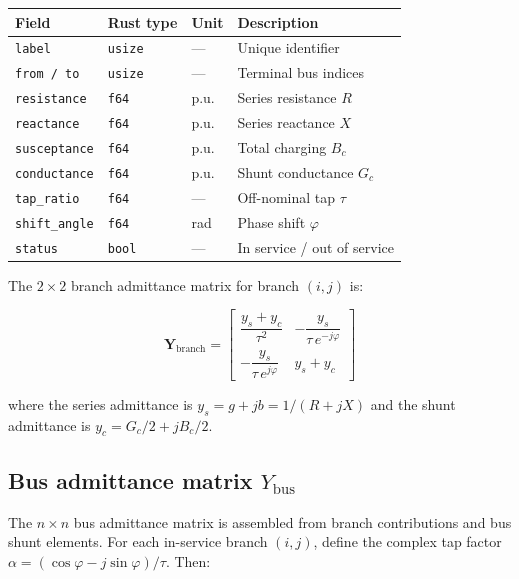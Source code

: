 \documentclass[11pt,a4paper]{article}
\begin{document}
\begin{center}
\small
\begin{tabular}{llll}
  \toprule
  \textbf{Field} & \textbf{Rust type} & \textbf{Unit} & \textbf{Description} \\
  \midrule
  \texttt{label}        & \texttt{usize} & --- & Unique identifier \\
  \texttt{from / to}    & \texttt{usize} & --- & Terminal bus indices \\
  \texttt{resistance}   & \texttt{f64}   & p.u. & Series resistance $R$ \\
  \texttt{reactance}    & \texttt{f64}   & p.u. & Series reactance $X$ \\
  \texttt{susceptance}  & \texttt{f64}   & p.u. & Total charging $B_c$ \\
  \texttt{conductance}  & \texttt{f64}   & p.u. & Shunt conductance $G_c$ \\
  \texttt{tap\_ratio}   & \texttt{f64}   & --- & Off-nominal tap $\tau$ \\
  \texttt{shift\_angle} & \texttt{f64}   & rad  & Phase shift $\varphi$ \\
  \texttt{status}       & \texttt{bool}  & --- & In service / out of service \\
  \bottomrule
\end{tabular}
\end{center}

\noindent
The $2\times2$ branch admittance matrix for branch $(i,j)$ is:

\begin{equation}\label{eq:ybranch}
  \mathbf{Y}_\text{branch} =
  \begin{bmatrix}
    \dfrac{y_s + y_c}{\tau^2}
    & -\dfrac{y_s}{\tau\,e^{-j\varphi}} \\[6pt]
    -\dfrac{y_s}{\tau\,e^{j\varphi}}
    & y_s + y_c
  \end{bmatrix}
\end{equation}

\noindent
where the series admittance is $y_s = g + jb = 1/(R + jX)$ and the shunt
admittance is $y_c = G_c/2 + jB_c/2$.

\subsection{Bus admittance matrix $Y_\text{bus}$}\label{sec:ybus}

The $n \times n$ bus admittance matrix is assembled from branch
contributions and bus shunt elements.  For each in-service branch
$(i,j)$, define the complex tap factor
$\alpha = (\cos\varphi - j\sin\varphi)/\tau$.  Then:
\end{document}
